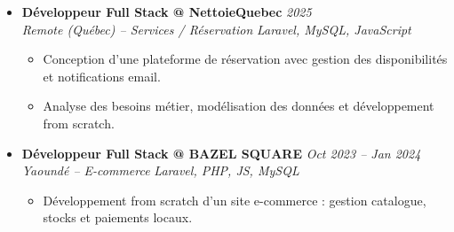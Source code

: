 \documentclass[a4paper,11pt]{article}
\begin{document}
\begin{itemize}[leftmargin=*, label={-}]
\item \textbf{Développeur Full Stack @ NettoieQuebec} \hfill \textit{2025} \\
\textit{Remote (Québec) -- Services / Réservation} \hfill \textit{Laravel, MySQL, JavaScript}
\vspace{-2pt}
    \begin{itemize}[leftmargin=0.4cm, nosep, label=\tiny$\bullet$]
        \item \small{Conception d'une plateforme de réservation avec gestion des disponibilités et notifications email.}
        \item \small{Analyse des besoins métier, modélisation des données et développement from scratch.}
    \end{itemize}
\vspace{3pt}

\item \textbf{Développeur Full Stack @ BAZEL SQUARE} \hfill \textit{Oct 2023 -- Jan 2024} \\
\textit{Yaoundé -- E-commerce} \hfill \textit{Laravel, PHP, JS, MySQL}
\vspace{-2pt}
    \begin{itemize}[leftmargin=0.4cm, nosep, label=\tiny$\bullet$]
        \item \small{Développement from scratch d'un site e-commerce : gestion catalogue, stocks et paiements locaux.}
    \end{itemize}
\vspace{3pt}

\end{itemize}

\end{document}
